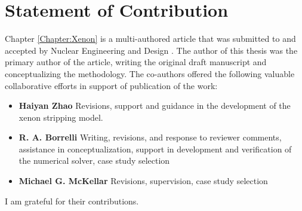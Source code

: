 \chapter{Statement of Contribution}
Chapter \ref{Chapter:Xenon} is a multi-authored article that was submitted to and accepted by Nuclear Engineering and Design \cite{RootXe}. The author of this thesis was the primary author of the article, writing the original draft manuscript and conceptualizing the methodology. The co-authors offered the following valuable collaborative efforts in support of publication of the work: 
\begin{itemize}
	\item \textbf{Haiyan Zhao} Revisions, support and guidance in the development of the xenon stripping model.
	\item \textbf{R. A. Borrelli} Writing, revisions, and response to reviewer comments, assistance in conceptualization, support in development and verification of the numerical solver, case study selection 
	\item \textbf{Michael G. McKellar} Revisions, supervision, case study selection
\end{itemize}

I am grateful for their contributions.
